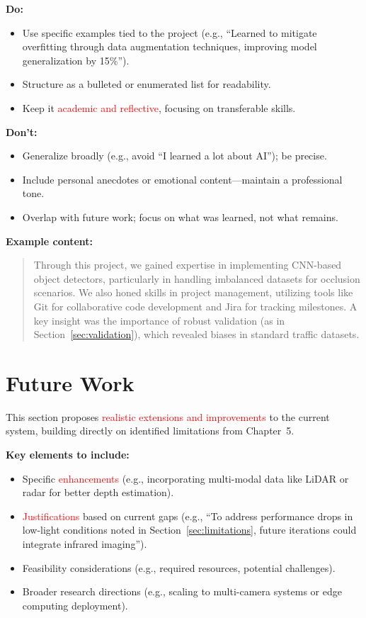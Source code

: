 \documentclass[12pt,a4paper]{report}
\theoremstyle{definition}
\theoremstyle{remark}
\begin{document}
\noindent \textbf{Do:}
\begin{itemize}
    \item Use specific examples tied to the project (e.g., ``Learned to mitigate overfitting through data augmentation techniques, improving model generalization by 15\%'').
    \item Structure as a bulleted or enumerated list for readability.
    \item Keep it \textcolor{red}{academic and reflective}, focusing on transferable skills.
\end{itemize}

\noindent \textbf{Don’t:}
\begin{itemize}
    \item Generalize broadly (e.g., avoid ``I learned a lot about AI''); be precise.
    \item Include personal anecdotes or emotional content—maintain a professional tone.
    \item Overlap with future work; focus on what was learned, not what remains.
\end{itemize}

\noindent \textbf{Example content:}
\begin{quote}
    Through this project, we gained expertise in implementing CNN-based object detectors, particularly in handling imbalanced datasets for occlusion scenarios. We also honed skills in project management, utilizing tools like Git for collaborative code development and Jira for tracking milestones. A key insight was the importance of robust validation (as in Section~\ref{sec:validation}), which revealed biases in standard traffic datasets.
\end{quote}

\section{Future Work}
\label{sec:future-work}

This section proposes \textcolor{red}{realistic extensions and improvements} to the current system, building directly on identified limitations from Chapter~5.

\noindent \textbf{Key elements to include:}
\begin{itemize}
    \item Specific \textcolor{red}{enhancements} (e.g., incorporating multi-modal data like LiDAR or radar for better depth estimation).
    \item \textcolor{red}{Justifications} based on current gaps (e.g., ``To address performance drops in low-light conditions noted in Section~\ref{sec:limitations}, future iterations could integrate infrared imaging'').
    \item Feasibility considerations (e.g., required resources, potential challenges).
    \item Broader research directions (e.g., scaling to multi-camera systems or edge computing deployment).
\end{itemize}
\end{document}
